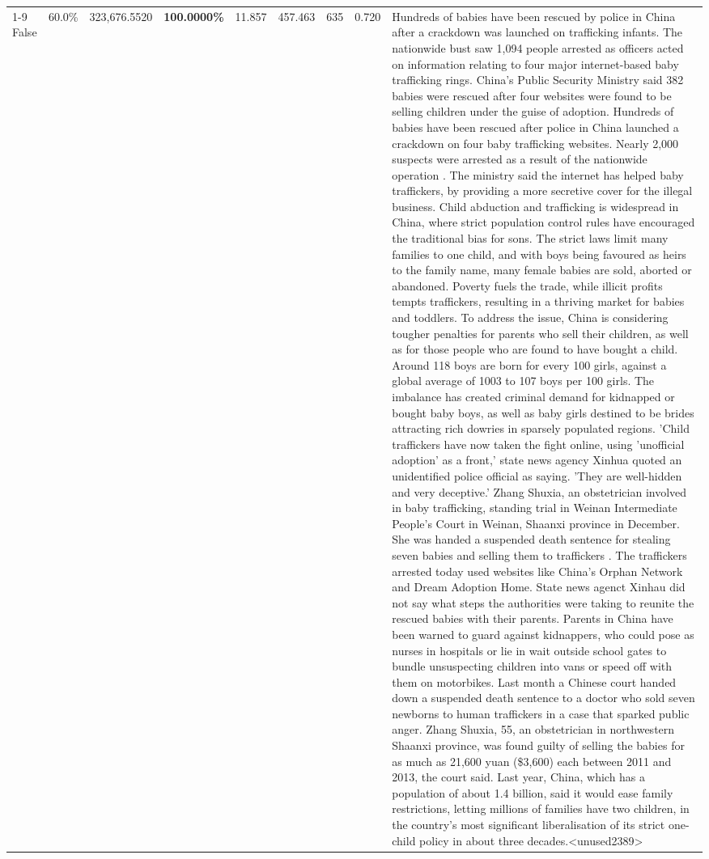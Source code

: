 \begin{table}[H]
\begin{tabular}{lllrlllll}
\cline{1-9}
False & 60.0\% & 323,676.5520 & \bfseries \color{red} 100.0000\% & 11.857 & 457.463 & 635 & 0.720 & Hundreds of babies have been rescued by police in China after a crackdown was launched on trafficking infants. The nationwide bust saw 1,094 people arrested as officers acted on information relating to four major internet-based baby trafficking rings. China's Public Security Ministry said 382 babies were rescued after four websites were found to be selling children under the guise of adoption. Hundreds of babies have been rescued after police in China launched a crackdown on four baby trafficking websites. Nearly 2,000 suspects were arrested as a result of the nationwide operation . The ministry said the internet has helped baby traffickers, by providing a more secretive cover for the illegal business. Child abduction and trafficking is widespread in China, where strict population control rules have encouraged the traditional bias for sons. The strict laws limit many families to one child, and with boys being favoured as heirs to the family name, many female babies are sold, aborted or abandoned. Poverty fuels the trade, while illicit profits tempts traffickers, resulting in a thriving market for babies and toddlers. To address the issue, China is considering tougher penalties for parents who sell their children, as well as for those people who are found to have bought a child. Around 118 boys are born for every 100 girls, against a global average of 1003 to 107 boys per 100 girls. The imbalance has created criminal demand for kidnapped or bought baby boys, as well as baby girls destined to be brides attracting rich dowries in sparsely populated regions. 'Child traffickers have now taken the fight online, using 'unofficial adoption' as a front,' state news agency Xinhua quoted an unidentified police official as saying. 'They are well-hidden and very deceptive.' Zhang Shuxia, an obstetrician involved in baby trafficking, standing trial in Weinan Intermediate People's Court in Weinan, Shaanxi province in December. She was handed a suspended death sentence for stealing seven babies and selling them to traffickers . The traffickers arrested today used websites like China's Orphan Network and Dream Adoption Home. State news agenct Xinhau did not say what steps the authorities were taking to reunite the rescued babies with their parents. Parents in China have been warned to guard against kidnappers, who could pose as nurses in hospitals or lie in wait outside school gates to bundle unsuspecting children into vans or speed off with them on motorbikes. Last month a Chinese court handed down a suspended death sentence to a doctor who sold seven newborns to human traffickers in a case that sparked public anger. Zhang Shuxia, 55, an obstetrician in northwestern Shaanxi province, was found guilty of selling the babies for as much as 21,600 yuan (\$3,600) each between 2011 and 2013, the court said. Last year, China, which has a population of about 1.4 billion, said it would ease family restrictions, letting millions of families have two children, in the country's most significant liberalisation of its strict one-child policy in about three decades.<unused2389> \\

\end{tabular}
\end{table}
